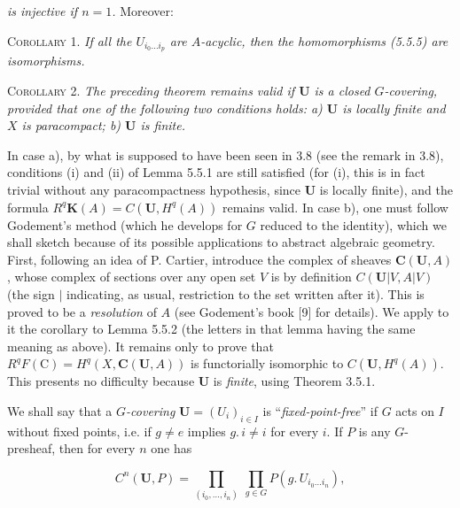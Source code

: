 \clearpage
{}

\noindent\textit{is injective if $n=1$.} Moreover:

\textsc{Corollary 1.} \textit{If all the $U_{i_0\ldots i_p}$ are
$A$-acyclic, then the homomorphisms \textup{(5.5.5)} are isomorphisms.}

\textsc{Corollary 2.} \textit{The preceding theorem remains valid if
${\mathbf U}$ is a closed $G$-covering, provided that one of the following two
conditions holds: a) ${\mathbf U}$ is locally finite and $X$ is paracompact;
b) ${\mathbf U}$ is finite.}

In case a), by what is supposed to have been seen in 3.8 (see the remark in
3.8), conditions (i) and (ii) of Lemma 5.5.1 are still satisfied (for (i), this
is in fact trivial without any paracompactness hypothesis, since ${\mathbf U}$
is locally finite), and the formula
$R^q\mathbf K(A)=C({\mathbf U},H^q(A))$ remains valid. In case b), one must
follow Godement's method (which he develops for $G$ reduced to the identity),
which we shall sketch because of its possible applications to abstract
algebraic geometry. First, following an idea of P. Cartier, introduce the
complex of sheaves ${\mathbf C}({\mathbf U},A)$, whose complex of sections over any open
set $V$ is by definition $C({\mathbf U}|V,A|V)$ (the sign $|$ indicating, as
usual, restriction to the set written after it). This is proved to be a
\emph{resolution} of $A$ (see Godement's book [9] for details). We apply to it the
corollary to Lemma 5.5.2 (the letters in that lemma having the same meaning as
above). It remains only to prove that
$R^qF(\mathrm C)=H^q(X,{\mathbf C}({\mathbf U},A))$ is functorially isomorphic to
$C({\mathbf U},H^q(A))$. This presents no difficulty because ${\mathbf U}$ is
\emph{finite}, using Theorem 3.5.1.

We shall say that a \emph{$G$-covering} ${\mathbf U}=(U_i)_{i\in I}$ is
``\emph{fixed-point-free}'' if $G$ acts on $I$ without fixed points, i.e. if $g\ne e$
implies $g.\, i\ne i$ for every $i$. If $P$ is any $G$-presheaf, then for
every $n$ one has

\[
\tag{5.5.6}
C^n({\mathbf U},P)=
\prod_{(i_0,\ldots,i_n)}\ \prod_{g\in G}
P(g.\, U_{i_0\ldots i_n}),
\]

